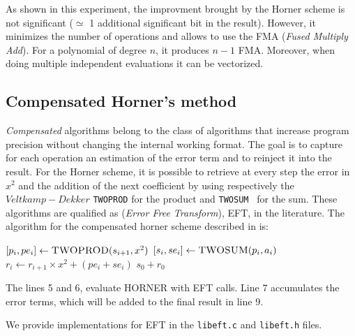 As shown in this experiment, the improvment brought by the Horner scheme is not significant ($\simeq$ 1 additional significant bit in the result).
However, it minimizes the
number of operations and allows to use the FMA ({\it Fused Multiply Add}). For
a polynomial of degree $n$, it produces $n-1$ FMA. Moreover, when doing
multiple independent evaluations it can be vectorized.

\subsection{Compensated Horner's method}

\emph{Compensated} algorithms belong to the class of algorithms that increase
program precision without changing the internal working format.
The goal is to capture for each operation an estimation of the error term and to reinject it into the result.
For the Horner scheme, it is possible to retrieve at every step the error in
$x^2$ and the addition of the next coefficient by using respectively the
$Veltkamp-Dekker$ {\tt TWOPROD} for the product and { \tt TWOSUM } for the sum.
These algorithms are qualified as ({\it Error Free Transform}), EFT, in the
literature.
The algorithm for the compensated horner scheme described in \cite{graillat2005compensated} is:

\begin{algorithmic}[1]
  \State $[p_i, pe_i] \gets \text{\sc TWOPROD}(s_{i+1}, x^2)$
  \State $[s_i, se_i] \gets \text{\sc TWOSUM}(p_i, a_i)$
  \State $r_i \gets r_{i+1}\times x^2+(pe_i+se_i)$
  \EndFor
  \State \Return $s_0 + r_0$
  \EndProcedure
\end{algorithmic}

The lines 5 and 6, evaluate HORNER with EFT calls. Line 7 accumulates the error terms, which will be added to the final result in line 9.

We provide implementations for EFT in the {\tt libeft.c} and {\tt libeft.h} files.

